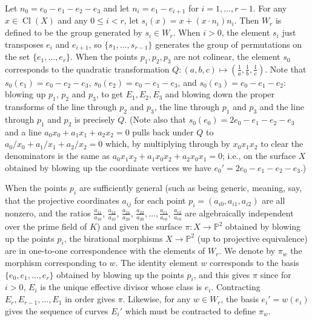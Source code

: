 \documentclass[11pt,twoside]{amsart}
\numberwithin{equation}{section}
\theoremstyle{definition}
\begin{document}
Let $n_0=e_0-e_1-e_2-e_3$ and let $n_i=e_1-e_{i+1}$ for $i=1,\ldots,r-1$.
For any $x\in\operatorname{Cl}(X)$ and any $0\leq i<r$, let $s_i(x)=x+(x\cdot n_i)n_i$.
Then $W_r$ is defined to be the group generated by $s_i\in W_r$.
When $i>0$, the element $s_i$ just transposes $e_i$ and $e_{i+1}$, so
$\{s_1,\ldots,s_{r-1}\}$ generates the group of permutations 
on the set $\{e_1,\ldots,e_r\}$. When the points
$p_1,p_2,p_3$ are not colinear,
the element $s_0$ corresponds to the quadratic transformation
$Q:(a,b,c)\mapsto(\frac{1}{a},\frac{1}{b},\frac{1}{c})$. 
Note that $s_0(e_1)=e_0-e_2-e_3$, $s_0(e_2)=e_0-e_1-e_3$, and $s_0(e_3)=e_0-e_1-e_2$:
blowing up $p_1$, $p_2$ and $p_3$, to get $E_1,E_2,E_3$ and blowing down the
proper transforms of the line through $p_2$ and $p_3$, the line through $p_1$ and $p_3$
and the line through $p_1$ and $p_2$ is precisely $Q$. 
(Note also that $s_0(e_0)=2e_0-e_1-e_2-e_3$
and a line $a_0x_0+a_1x_1+a_2x_2=0$ pulls back under $Q$ to 
$a_0/x_0+a_1/x_1+a_2/x_2=0$ which, by multiplying through by $x_0x_1x_2$ 
to clear the denominators is the same as $a_0x_1x_2+a_1x_0x_2+a_2x_0x_1=0$;
i.e., on the surface $X$ obtained by blowing up the coordinate vertices
we have $e_0'=2e_0-e_1-e_2-e_3$.)

When the points $p_i$ are sufficiently general (such as being generic,
meaning, say, that the projective coordinates $a_{ij}$ for each point $p_i=(a_{i0},a_{i1},a_{i2})$ are all nonzero,
and the ratios $\frac{a_{11}}{a_{10}}$, $\frac{a_{12}}{a_{10}}$, $\frac{a_{21}}{a_{20}}$,
$\frac{a_{22}}{a_{20}},\ldots,\frac{a_{r1}}{a_{r0}}$, $\frac{a_{r2}}{a_{r0}}$
are algebraically independent over the prime field of ${K}$)
and given the surface $\pi:X\to{\mathbb{P}^{2}}$ obtained by blowing up the points $p_i$,
the birational morphisms $X\to{\mathbb{P}^{2}}$ (up to projective equivalence) are in one-to-one correspondence
with the elements of $W_r$. We denote by $\pi_w$ the morphism corresponding to $w$. 
The identity element $w$ corresponds to the
basis $\{e_0,e_1,\ldots,e_r\}$ obtained by blowing up the points $p_i$, and this gives $\pi$ since for $i>0$, 
$E_i$ is the unique effective divisor whose class is $e_i$. Contracting $E_r, E_{r-1},\ldots,E_1$ in order
gives $\pi$. Likewise, for any $w\in W_r$, the basis $e_i'=w(e_i)$ gives the sequence of curves $E_i'$
which must be contracted to define $\pi_w$.
\end{document}
